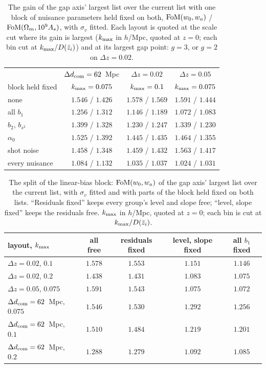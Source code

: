 \documentclass[11pt]{article}
\newcommand{\dcom}{$\Delta d_{\rm com} = 62$~Mpc}
\newcommand{\sv}{\sigma_v}
\begin{document}
\begin{table}[ht]
  \centering
  \small
  \setlength{\tabcolsep}{5pt}
  \begin{tabular}{lccc}
    \hline
    & \dcom{} & $\Delta z = 0.02$ & $\Delta z = 0.05$ \\
    block held fixed & $k_{\rm max} = 0.075$ & $k_{\rm max} = 0.1$
      & $k_{\rm max} = 0.075$ \\
    \hline
    none & $1.546$ / $1.426$ & $1.578$ / $1.569$ & $1.591$ / $1.444$ \\
    all $b_1$ & $1.256$ / $1.312$ & $1.146$ / $1.189$ & $1.072$ / $1.083$ \\
    $b_2$, $b_{s^2}$ & $1.399$ / $1.328$ & $1.230$ / $1.247$ & $1.339$ / $1.230$ \\
    $\alpha_0$ & $1.525$ / $1.392$ & $1.445$ / $1.435$ & $1.464$ / $1.355$ \\
    shot noise & $1.458$ / $1.348$ & $1.459$ / $1.432$ & $1.563$ / $1.417$ \\
    every nuisance & $1.084$ / $1.132$ & $1.035$ / $1.037$ & $1.024$ / $1.031$ \\
    \hline
  \end{tabular}
  \caption{The gain of the gap axis' largest list over the current
    list with one block of nuisance parameters held fixed on both,
    ${\rm FoM}(w_0, w_a)$ / ${\rm FoM}(\Omega_m, 10^9 A_s)$, with
    $\sv$ fitted.  Each layout is quoted at the scale cut where its
    gain is largest ($k_{\rm max}$ in $h$/Mpc, quoted at $z = 0$;
    each bin cut at $k_{\rm max}/D(\bar{z}_i)$) and at its largest
    gap point: $g = 3$, or $g = 2$ on $\Delta z = 0.02$.}
  \label{tab:attribution}
\end{table}

\begin{table}[ht]
  \centering
  \small
  \setlength{\tabcolsep}{5pt}
  \begin{tabular}{lcccc}
    \hline
    layout, $k_{\rm max}$ & all free & residuals fixed
      & level, slope fixed & all $b_1$ fixed \\
    \hline
    $\Delta z = 0.02$, $0.1$ & $1.578$ & $1.553$ & $1.151$ & $1.146$ \\
    $\Delta z = 0.02$, $0.2$ & $1.438$ & $1.431$ & $1.083$ & $1.075$ \\
    $\Delta z = 0.05$, $0.075$ & $1.591$ & $1.543$ & $1.075$ & $1.072$ \\
    \dcom{}, $0.075$ & $1.546$ & $1.530$ & $1.292$ & $1.256$ \\
    \dcom{}, $0.1$ & $1.510$ & $1.484$ & $1.219$ & $1.201$ \\
    \dcom{}, $0.2$ & $1.288$ & $1.279$ & $1.092$ & $1.085$ \\
    \hline
  \end{tabular}
  \caption{The split of the linear-bias block: ${\rm FoM}(w_0, w_a)$
    of the gap axis' largest list over the current list, with $\sv$
    fitted and with parts of the block held fixed on both lists.
    ``Residuals fixed'' keeps every group's level and slope free;
    ``level, slope fixed'' keeps the residuals free.  $k_{\rm max}$
    in $h$/Mpc, quoted at $z = 0$; each bin is cut at
    $k_{\rm max}/D(\bar{z}_i)$.}
  \label{tab:b1split}
\end{table}
\end{document}
